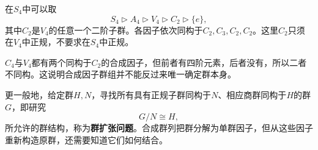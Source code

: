 \begin{example}
在$S_4$中可以取
\[
S_4\triangleright A_4\triangleright V_4\triangleright C_2\triangleright\{e\},
\]
其中$C_2$是$V_4$的任意一个二阶子群。各因子依次同构于$C_2,C_3,C_2,C_2$。这里$C_2$只须在$V_4$中正规，不要求在$S_4$中正规。

$C_4$与$V_4$都有两个同构于$C_2$的合成因子，但前者有四阶元素，后者没有，所以二者不同构。这说明合成因子群组并不能反过来唯一确定群本身。
\end{example}

更一般地，给定群$H,N$，寻找所有具有正规子群同构于$N$、相应商群同构于$H$的群$G$，即研究
\[
G/N\cong H,
\]
所允许的群结构，称为\textbf{群扩张问题}。合成群列把群分解为单群因子，但从这些因子重新构造原群，还需要知道它们如何结合。
